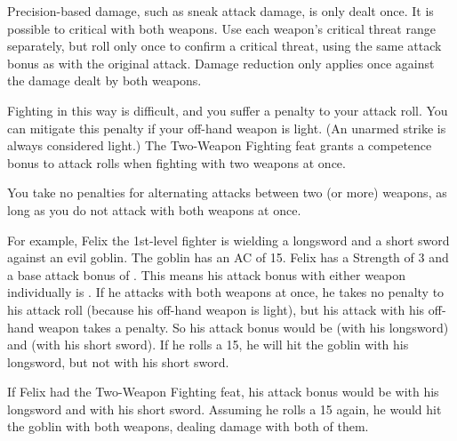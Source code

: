 \par Precision-based damage, such as sneak attack damage, is only dealt once. It is possible to critical with both weapons. Use each weapon's critical threat range separately, but roll only once to confirm a critical threat, using the same attack bonus as with the original attack. Damage reduction only applies once against the damage dealt by both weapons.

\par Fighting in this way is difficult, and you suffer a  penalty to your attack roll. You can mitigate this penalty if your off-hand weapon is light. (An unarmed strike is always considered light.) The Two-Weapon Fighting feat grants a  competence bonus to attack rolls when fighting with two weapons at once.

You take no penalties for alternating attacks between two (or more) weapons, as long as you do not attack with both weapons at once.

\par For example, Felix the 1st-level fighter is wielding a longsword and a short sword against an evil goblin. The goblin has an AC of 15. Felix has a Strength of 3 and a base attack bonus of . This means his attack bonus with either weapon individually is . If he attacks with both weapons at once, he takes no penalty to his attack roll (because his off-hand weapon is light), but his attack with his off-hand weapon takes a  penalty. So his attack bonus would be  (with his longsword) and  (with his short sword). If he rolls a 15, he will hit the goblin with his longsword, but not with his short sword.

\par If Felix had the Two-Weapon Fighting feat, his attack bonus would be  with his longsword and  with his short sword. Assuming he rolls a 15 again, he would hit the goblin with both weapons, dealing damage with both of them.

